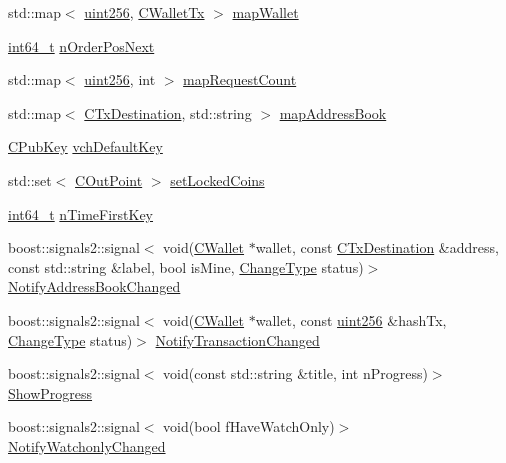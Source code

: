 \begin{DoxyCompactItemize}
\item 
std\+::map$<$ \hyperlink{classuint256}{uint256}, \hyperlink{class_c_wallet_tx}{C\+Wallet\+Tx} $>$ \hyperlink{class_c_wallet_a0b17f72f2170090f2de43a6c48af3214}{map\+Wallet}
\item 
\hyperlink{stdint_8h_adec1df1b8b51cb32b77e5b86fff46471}{int64\+\_\+t} \hyperlink{class_c_wallet_af56cb17b19742506fc8d9449fc60884e}{n\+Order\+Pos\+Next}
\item 
std\+::map$<$ \hyperlink{classuint256}{uint256}, int $>$ \hyperlink{class_c_wallet_ade5f0fc0e722433b421c32f97bd873a8}{map\+Request\+Count}
\item 
std\+::map$<$ \hyperlink{keystore_8h_a8f46ecba0ddeb036be6b58d6ed1909cd}{C\+Tx\+Destination}, std\+::string $>$ \hyperlink{class_c_wallet_afed31f2489c987e0f76233121ed84ab7}{map\+Address\+Book}
\item 
\hyperlink{class_c_pub_key}{C\+Pub\+Key} \hyperlink{class_c_wallet_a6d415899e530a91e6e28dd0fa4ecef8d}{vch\+Default\+Key}
\item 
std\+::set$<$ \hyperlink{class_c_out_point}{C\+Out\+Point} $>$ \hyperlink{class_c_wallet_a658aebcd4c617f5a29f5df3d8878c450}{set\+Locked\+Coins}
\item 
\hyperlink{stdint_8h_adec1df1b8b51cb32b77e5b86fff46471}{int64\+\_\+t} \hyperlink{class_c_wallet_a817c0d1034377a7bd70a714140a5a8ca}{n\+Time\+First\+Key}
\item 
boost\+::signals2\+::signal$<$ void(\hyperlink{class_c_wallet}{C\+Wallet} $\ast$wallet, const \hyperlink{keystore_8h_a8f46ecba0ddeb036be6b58d6ed1909cd}{C\+Tx\+Destination} \&address, const std\+::string \&label, bool is\+Mine, \hyperlink{ui__interface_8h_a293ba931937e469a6327b8d6b4872969}{Change\+Type} status)$>$ \hyperlink{class_c_wallet_a86f4563888686dd3dbdee406f74f8d3f}{Notify\+Address\+Book\+Changed}
\item 
boost\+::signals2\+::signal$<$ void(\hyperlink{class_c_wallet}{C\+Wallet} $\ast$wallet, const \hyperlink{classuint256}{uint256} \&hash\+Tx, \hyperlink{ui__interface_8h_a293ba931937e469a6327b8d6b4872969}{Change\+Type} status)$>$ \hyperlink{class_c_wallet_acd26616ef558afbc5bc62d72603957fc}{Notify\+Transaction\+Changed}
\item 
boost\+::signals2\+::signal$<$ void(const std\+::string \&title, int n\+Progress)$>$ \hyperlink{class_c_wallet_a845a2f2911b9b022f0e58ab577e795ea}{Show\+Progress}
\item 
boost\+::signals2\+::signal$<$ void(bool f\+Have\+Watch\+Only)$>$ \hyperlink{class_c_wallet_a52e8f380ef8d36622381687056d95df8}{Notify\+Watchonly\+Changed}
\end{DoxyCompactItemize}

